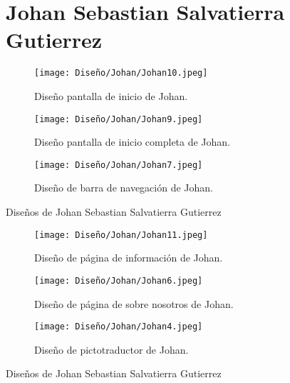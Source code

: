 \begin{figure}[h!]
  \section{Johan Sebastian Salvatierra Gutierrez}
  \begin{subfigure}{\textwidth}
    \centering
    \texttt{[image: Diseño/Johan/Johan10.jpeg]}
    \caption{Diseño pantalla de inicio de Johan.}
    \label{Johan10}
  \end{subfigure}

  \begin{subfigure}{\textwidth}
    \centering
    \texttt{[image: Diseño/Johan/Johan9.jpeg]}
    \caption{Diseño pantalla de inicio completa de Johan.}
    \label{Johan9}
  \end{subfigure}

  \begin{subfigure}{\textwidth}
    \centering
    \texttt{[image: Diseño/Johan/Johan7.jpeg]}
    \caption{Diseño de barra de navegación de Johan.}
    \label{Johan7}
  \end{subfigure}

  \caption{Diseños de Johan Sebastian Salvatierra Gutierrez}
  \label{fig:disenyoJohan}
\end{figure}

\begin{figure}[h!]
  \ContinuedFloat
  \begin{subfigure}{\textwidth}
    \centering
    \texttt{[image: Diseño/Johan/Johan11.jpeg]}
  \caption{Diseño de página de información de Johan.}
  \label{Johan11}
  \end{subfigure}

  \begin{subfigure}{\textwidth}
    \centering
    \texttt{[image: Diseño/Johan/Johan6.jpeg]}
    \caption{Diseño de página de sobre nosotros de Johan.}
    \label{Johan6}
  \end{subfigure}

  \begin{subfigure}{\textwidth}
    \centering
    \texttt{[image: Diseño/Johan/Johan4.jpeg]}
    \caption{Diseño de pictotraductor de Johan.}
    \label{Johan4}
  \end{subfigure}

  \caption{Diseños de Johan Sebastian Salvatierra Gutierrez}
  \label{fig:disenyoJohan}
\end{figure}

